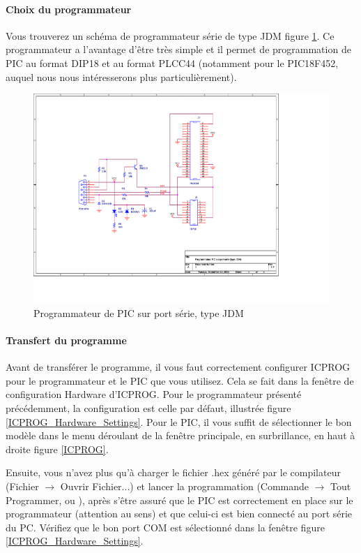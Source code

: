 \documentclass[a4paper]{article}
\begin{document}
\paragraph{Choix du programmateur}

Vous trouverez un schéma de programmateur série de type JDM figure \ref{Programmateur_JDM}. Ce programmateur a l'avantage d'être très simple et il permet de programmation de PIC au format DIP18 et au format PLCC44 (notamment pour le PIC18F452, auquel nous nous intéresserons plus particulièrement).

\begin{figure}[H]
	\centering
	\includegraphics[scale=1.00]{Images/Programmateur_JDM}
	\caption{Programmateur de PIC sur port série, type JDM
		\label{Programmateur_JDM}}
\end{figure}

\paragraph{Transfert du programme}

Avant de transférer le programme, il vous faut correctement configurer ICPROG pour le programmateur et le PIC que vous utilisez. Cela se fait dans la fenêtre de configuration Hardware d'ICPROG. Pour le programmateur présenté précédemment, la configuration est celle par défaut, illustrée figure \ref{ICPROG_Hardware_Settings}. Pour le PIC, il vous suffit de sélectionner le bon modèle dans le menu déroulant de la fenêtre principale, en surbrillance, en haut à droite figure \ref{ICPROG}.

Ensuite, vous n'avez plus qu'à charger le fichier .hex généré par le compilateur (\og{}Fichier\fg{} $\rightarrow$ \og{}Ouvrir Fichier...\fg{}) et lancer la programmation (\og{}Commande\fg{} $\rightarrow$ \og{}Tout Programmer\fg{}, ou ), après s'être assuré que le PIC est correctement en place sur le programmateur (attention au sens) et que celui-ci est bien connecté au port série du PC. Vérifiez que le bon port COM est sélectionné dans la fenêtre figure \ref{ICPROG_Hardware_Settings}.
\end{document}
